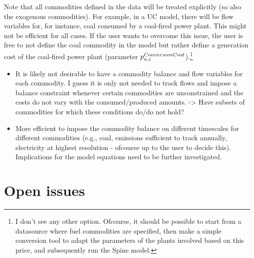 \documentclass[10pt,english]{article}
\begin{document}
Note that all commodities defined in the data will be treated explicitly (so also the exogenous commodities). For example, in a UC model, there will be flow variables for, for instance, coal consumed by a coal-fired power plant. This might not be efficient for all cases. If the user wants to overcome this issue, the user is free to not define the coal commodity in the model but rather define a generation cost of the coal-fired power plant (parameter $p^{ConversionCost}_{u,c}$).\footnote{I don't see any other option. Ofcourse, it should be possible to start from a datasource where fuel commodities are specified, then make a simple conversion tool to adapt the parameters of the plants involved based on this price, and subsequently run the Spine model.} 



{\color{red}
\begin{itemize}
\item It is likely not desirable to have a commodity balance and flow variables for each commodity. I guess it is only not needed to track flows and impose a balance constraint whenever certain commodities are unconstrained and the costs do not vary with the consumed/produced amounts. -> Have subsets of commodities for which these conditions do/do not hold?
\item More efficient to impose the commodity balance on different timescales for different commodities (e.g., coal, emissions sufficient to track annually, electricity at highest resolution - ofcourse up to the user to decide this). Implications for the model equations need to be further investigated. 
\end{itemize}
}








\clearpage
\section{Open issues}


\end{document}
